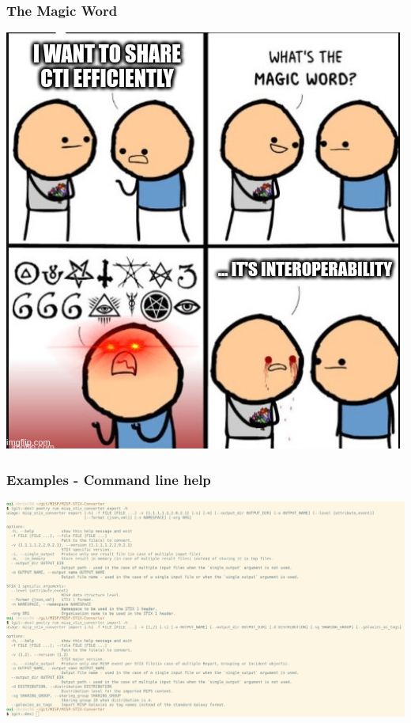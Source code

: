 \begin{frame}
    \frametitle{The Magic Word}
    \centering
    \includegraphics[scale=0.41]{images/magic_word.png}
\end{frame}

\begin{frame}
    \frametitle{Examples - Command line help}
    \includegraphics[scale=0.16]{images/command_line_help.png}
\end{frame}

